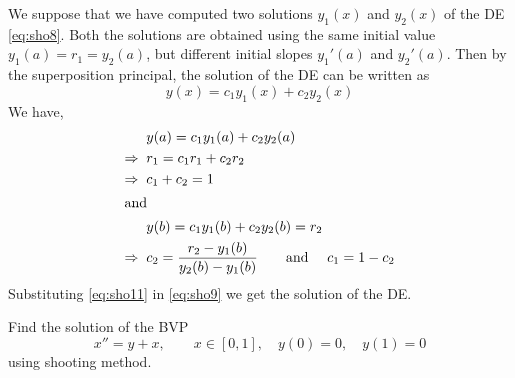 \documentclass[../main-sheet.tex]{subfiles}
\begin{document}
We suppose that we have computed two solutions \(y_1(x)\) and \(y_2(x)\) of the DE \eqref{eq:sho8}. Both the solutions are obtained using the same initial value \(y_1(a)=r_1=y_2(a)\), but different initial slopes \(y_1'(a)\) and \(y_2'(a)\). Then by the superposition principal, the solution of the DE can be written as
\begin{equation}
    y(x)=c_1y_1(x)+c_2y_2(x) \label{eq:sho9}
\end{equation}
We have, 
\begin{align}
    &y(a)=c_1y_1(a)+c_2y_2(a)\notag\\
    \Rightarrow\;\;&r_1=c_1r_1+c_2r_2\notag\\
    \Rightarrow\;\;&c_1+c_2=1\label{eq:sho10}\\
    \intertext{and}
    &y(b)=c_1y_1(b)+c_2y_2(b)=r_2\notag\\
    \Rightarrow\;\;&c_2=\frac{r_2-y_1(b)}{y_2(b)-y_1(b)}\qquad \text{and }\quad c_1=1-c_2\label{eq:sho11}
\end{align}
Substituting \eqref{eq:sho11} in \eqref{eq:sho9} we get the solution of the DE.
\begin{ex}
    Find the solution of the BVP
    \[x''=y+x,\qquad x\in [0,1],\quad y(0)=0,\quad y(1)=0\]
    using shooting method.
\end{ex}
\end{document}
